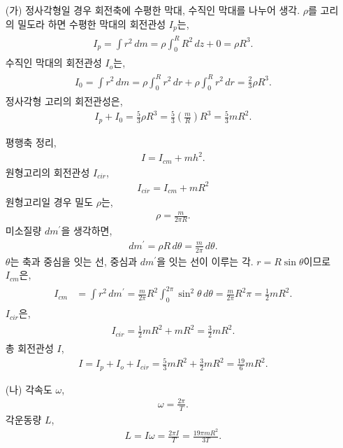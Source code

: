 \documentclass[floatfix,nofootinbib,superscriptaddress,fleqn]{revtex4-2}
\begin{document}
\begin{itemize}
  \item[(가)] 
  정사각형일 경우 회전축에 수평한 막대, 수직인 막대를 나누어 생각. $\rho$를 고리의 밀도라 하면
  수평한 막대의 회전관성 
  $I_{p}$는,
  \begin{align}
    \begin{split}
      I_{p} = \int r^2\,dm = \rho\int_0^R R^2\,dz + 0 = \rho R^3.  
    \end{split}
  \end{align}
  수직인 막대의 회전관성 $I_{o}$는,
  \begin{align}
    \begin{split}
      I_{0} = \int r^2\,dm = \rho\int_0^R r^2\,dr+\rho\int_0^R r^2\,dr
      =\frac{2}{3}\rho R^3. 
    \end{split}
  \end{align}
  정사각형 고리의 회전관성은,
  \begin{align}
    I_{p}+I_{0} = \frac{5}{3}\rho R^3 = \frac{5}{3}\left(\frac{m}{R}\right) R^3
    =  \frac{5}{3}mR^2.
  \end{align}
 
  평행축 정리, 
  \begin{align}
    I = I_{cm}+mh^2.
  \end{align}
  원형고리의 회전관성 $I_{cir}$,
  \begin{align}
    I_{cir} = I_{cm}+mR^2
  \end{align}
  원형고리일 경우 밀도 $\rho$는,
  \begin{align}
    \rho = \frac{m}{2\pi R}.
  \end{align}
  미소질량 $dm^\prime$을 생각하면,
  \begin{align}
    dm^\prime = \rho R\,d\theta = \frac{m}{2\pi}\,d\theta.
  \end{align}
  $\theta$는 축과 중심을 잇는 선, 중심과 $dm^\prime$을 잇는 선이 이루는 각.
  $r=R\sin\theta$이므로 $I_{cm}$은,
  \begin{align}
    \begin{split}
      I_{cm} &= \int r^2\,dm^\prime = \frac{m}{2\pi}R^2
      \int_0^{2\pi}\sin^2\theta\,d\theta
      = \frac{m}{2\pi}R^2\pi = \frac{1}{2}mR^2.
    \end{split}
  \end{align}
  $I_{cir}$은,
  \begin{align}
    \begin{split}
      I_{cir} = \frac{1}{2}mR^2+mR^2 = \frac{3}{2}mR^2.
    \end{split}
  \end{align}
  총 회전관성 $I$,
  \begin{align}
    I = I_p+I_o+I_{cir} = \frac{5}{3}mR^2+\frac{3}{2}mR^2=\frac{19}{6}mR^2.
  \end{align}
  \item[(나)] 각속도 $\omega$,
  \begin{align}
    \omega = \frac{2\pi}{T}.
  \end{align}
  각운동량 $L$,
  \begin{align}
    L = I\omega = \frac{2\pi I}{T} = \frac{19\pi mR^2}{3T}.
  \end{align}
  \end{itemize}
\end{document}
